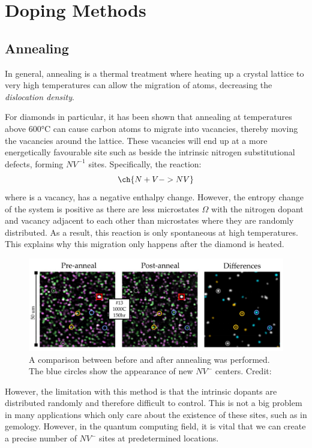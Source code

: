 \documentclass[12pt]{article}
\begin{document}
    \section{Doping Methods}
    \subsection{Annealing}
    In general, annealing is a thermal treatment where heating up a crystal lattice to very high temperatures can allow the migration of atoms, decreasing the \textit{dislocation density}.

    For diamonds in particular, it has been shown that annealing at temperatures above $600\si{\celsius}$ can cause carbon atoms to migrate into vacancies, thereby moving the vacancies around the lattice\cite{best}. These vacancies will end up at a more energetically favourable site such as beside the intrinsic nitrogen substitutional defects, forming $NV^{-1}$ sites. Specifically, the reaction:
    \begin{equation}
        \ch{N+V->NV}
    \end{equation} 
    where  is a vacancy, has a negative enthalpy change\cite{anneal}. However, the entropy change of the system is positive as there are less microstates $\Omega$ with the nitrogen dopant and vacancy adjacent to each other than microstates where they are randomly distributed. As a result, this reaction is only spontaneous at high temperatures. This explains why this migration only happens after the diamond is heated.
    
    \begin{figure}[h]
        \centering
        \includegraphics[width=0.8\linewidth]{figures/anneal.jpg}
        \caption{A comparison between before and after annealing was performed. The blue circles show the appearance of new $NV^{-}$ centers. Credit:\cite{Chakravarthi2020}}
        \label{fig:anneal}
    \end{figure}
    
    However, the limitation with this method is that the intrinsic dopants are distributed randomly and therefore difficult to control. This is not a big problem in many applications which only care about the existence of these sites, such as in gemology. However, in the quantum computing field, it is vital that we can create a precise number of $NV^{-}$ sites at predetermined locations.
    
\end{document}
